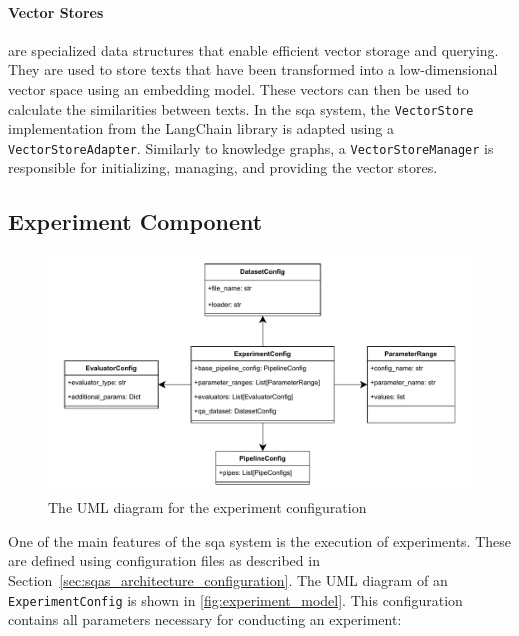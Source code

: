 \paragraph{Vector Stores} are specialized data structures that enable efficient vector storage and querying. They are used to store texts that have been transformed into a low-dimensional vector space using an embedding model. These vectors can then be used to calculate the similarities between texts. In the \gls{sqa} system, the \texttt{VectorStore} implementation from the LangChain library is adapted using a \texttt{VectorStoreAdapter}. Similarly to knowledge graphs, a \texttt{VectorStoreManager} is responsible for initializing, managing, and providing the vector stores.

\subsection{Experiment Component}

\begin{figure}[t]
    \centering
    \includegraphics[width=0.99\linewidth]{figures/framework/figures-Experiment_model.drawio.pdf}
    \caption[UML Diagram for a Experiment Configuration]{The UML diagram for the experiment configuration}
    \label{fig:experiment_model}
\end{figure}

One of the main features of the \gls{sqa} system is the execution of experiments. These are defined using configuration files as described in Section~\ref{sec:sqas_architecture_configuration}. The UML diagram of an \texttt{ExperimentConfig} is shown in \autoref{fig:experiment_model}. This configuration contains all parameters necessary for conducting an experiment:

